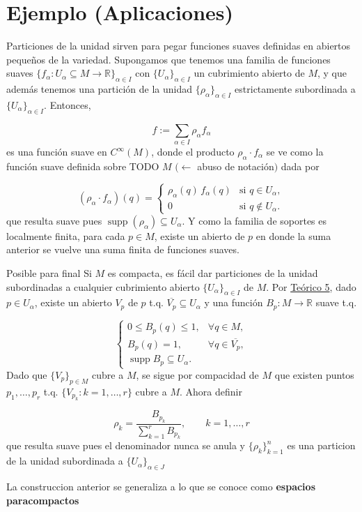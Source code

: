 \section{Ejemplo (Aplicaciones)}
\begin{bookremark}{}
Particiones de la unidad sirven para pegar funciones suaves definidas en abiertos pequeños de la variedad. Supongamos que tenemos una familia de funciones suaves $\{f_\alpha:U_\alpha\subseteq M\to\mathbb{R}\}_{\alpha\in I}$ con $\{U_\alpha\}_{\alpha\in I}$ un cubrimiento abierto de $M$, y que además tenemos una partición de la unidad $\{\rho_\alpha\}_{\alpha\in I}$ estrictamente subordinada a $\{U_\alpha\}_{\alpha\in I}$. Entonces,

\[
f:=\sum_{\alpha\in I}\rho_\alpha f_\alpha
\]
es una función suave en $C^\infty(M)$, donde el producto $\rho_\alpha\cdot f_\alpha$ se ve como la función suave definida sobre TODO $M$ $(\leftarrow$ abuso de notación$)$ dada por

\[
(\rho_\alpha\cdot f_\alpha)(q)=\begin{cases}\rho_\alpha(q)\,f_\alpha(q)&\text{si }q\in U_\alpha,\\0&\text{si }q\notin U_\alpha.\end{cases}
\]
que resulta suave pues $\operatorname{supp}(\rho_\alpha)\subseteq U_\alpha$. Y como la familia de soportes es localmente finita, para cada $p\in M$, existe un abierto de $p$ en donde la suma anterior se vuelve una suma finita de funciones suaves.

\end{bookremark}
\begin{bookremark}{Posible para final}
Si $M$ es compacta, es fácil dar particiones de la unidad subordinadas a cualquier cubrimiento abierto $\{U_\alpha\}_{\alpha\in I}$ de $M$. Por \hyperref[blk:45cd5d]{Teórico 5}, dado $p\in U_\alpha$, existe un abierto $V_p$ de $p$ t.q. $\overline{V_p}\subseteq U_\alpha$ y una función $B_p:M\to\mathbb{R}$ suave t.q.

\[
\begin{cases}0\leq B_p(q)\leq 1,&\forall q\in M,\\B_p(q)=1,&\forall q\in \overline{V_p},\\\operatorname{supp}B_p\subseteq U_\alpha.\end{cases}
\]
Dado que $\{V_p\}_{p\in M}$ cubre a $M$, se sigue por compacidad de $M$ que existen puntos $p_1,\dots,p_r$ t.q. $\{V_{p_k}:k=1,\dots,r\}$ cubre a $M$. Ahora definir

\[
\rho_k=\frac{B_{p_k}}{\sum_{k=1}^r B_{p_k}},\qquad k=1,\dots,r
\]
que resulta suave pues el denominador nunca se anula y $\{ \rho_{k} \}_{k=1}^{n}$ es una particion de la unidad subordinada a $\{ U_{\alpha } \}_{\alpha \in J}$

\end{bookremark}
\begin{bookremark}{}
La construccion anterior se generaliza a lo que se conoce como \textbf{espacios paracompactos}

\end{bookremark}
